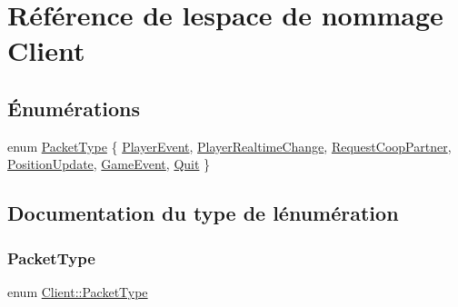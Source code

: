 \hypertarget{namespace_client}{}\section{Référence de l\textquotesingle{}espace de nommage Client}
\label{namespace_client}
\subsection*{Énumérations}
\begin{DoxyCompactItemize}
\item 
enum \hyperlink{namespace_client_a68298dc54679aba9954afeb49186f8f0}{Packet\+Type} \{ \newline
\hyperlink{namespace_client_a68298dc54679aba9954afeb49186f8f0a0f8c859139743670c8857b1171f3190f}{Player\+Event}, 
\hyperlink{namespace_client_a68298dc54679aba9954afeb49186f8f0af3f827b67daf73b4279c40db7038fbc5}{Player\+Realtime\+Change}, 
\hyperlink{namespace_client_a68298dc54679aba9954afeb49186f8f0ab459d65fd0dd652bcebd47ae2fa34562}{Request\+Coop\+Partner}, 
\hyperlink{namespace_client_a68298dc54679aba9954afeb49186f8f0a652ae5004a25238753496263ac611931}{Position\+Update}, 
\newline
\hyperlink{namespace_client_a68298dc54679aba9954afeb49186f8f0af6b97290a991c4d6c77a3602005621de}{Game\+Event}, 
\hyperlink{namespace_client_a68298dc54679aba9954afeb49186f8f0a5919cda70d04df71aec7923f264f2e9e}{Quit}
 \}
\end{DoxyCompactItemize}


\subsection{Documentation du type de l\textquotesingle{}énumération}
\hypertarget{namespace_client_a68298dc54679aba9954afeb49186f8f0}{}\label{namespace_client_a68298dc54679aba9954afeb49186f8f0} 
\subsubsection{\texorpdfstring{Packet\+Type}{PacketType}}
{\footnotesize\ttfamily enum \hyperlink{namespace_client_a68298dc54679aba9954afeb49186f8f0}{Client\+::\+Packet\+Type}}

